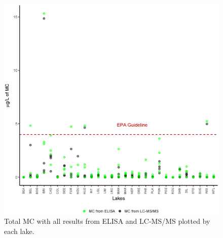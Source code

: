 \begin{figure}[p]
	\includegraphics[width=\textwidth]{figures/Microcystin}
	\caption{Total MC with all results from ELISA and LC-MS/MS plotted by each lake.}
	\label{fig:microcystin}
\end{figure}


